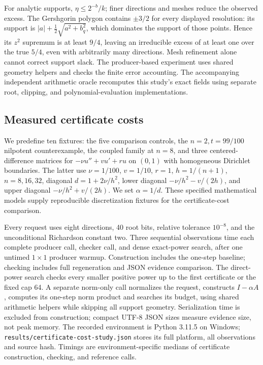 \documentclass[11pt]{article}
\theoremstyle{definition}
\theoremstyle{remark}
\numberwithin{equation}{section}
\begin{document}
For analytic supports, \(\eta\le2^{-b}/k\); finer directions and meshes
reduce the observed excess. The Gershgorin polygon contains
\(\pm3/2\) for every displayed resolution: its support is
\(|a|+\tfrac12\sqrt{a^2+b_q^2}\), which dominates the support of those points.
Hence its \(z^2\) supremum is at least \(9/4\), leaving an irreducible
excess of at least one over the true \(5/4\), even with arbitrarily many
directions. Mesh refinement alone cannot correct support slack.
The producer-based experiment uses shared geometry helpers and checks
the finite error accounting. The accompanying independent arithmetic
oracle recomputes this study's exact fields using separate root, clipping,
and polynomial-evaluation implementations.

\subsection{Measured certificate costs}\label{sec:cost}
We predefine ten fixtures: the five comparison controls, the
\(n=2,t=99/100\) nilpotent counterexample, the coupled family at \(n=8\),
and three centered-difference matrices for
\(-\nu u''+v u'+r u\) on \((0,1)\) with homogeneous Dirichlet boundaries.
The latter use \(\nu=1/100\), \(v=1/10\), \(r=1\),
\(h=1/(n+1)\), \(n=8,16,32\), diagonal \(d=1+2\nu/h^2\),
lower diagonal \(-\nu/h^2-v/(2h)\), and upper diagonal
\(-\nu/h^2+v/(2h)\). We set \(\alpha=1/d\).
These specified mathematical models supply reproducible discretization
fixtures for the certificate-cost comparison.

Every request uses eight directions, 40 root bits, relative tolerance
\(10^{-8}\), and the unconditional Richardson constant two. Three
sequential observations time each complete producer call, checker call,
and dense exact-power search, after one untimed \(1\times1\) producer
warmup. Construction includes the one-step baseline; checking includes
full regeneration and JSON evidence comparison. The direct-power search
checks every smaller positive power up to the first certificate or the
fixed cap 64. A separate norm-only call normalizes the request, constructs
\(I-\alpha A\), computes its one-step norm product and searches its budget,
using shared arithmetic helpers while skipping all support geometry. Serialization time is excluded from construction; compact
UTF-8 JSON sizes measure evidence size, not peak memory.
The recorded environment is Python 3.11.5 on Windows;
\nolinkurl{results/certificate-cost-study.json} stores its full platform,
all observations and source hash. Timings are environment-specific
medians of certificate construction, checking, and reference calls.
\end{document}
